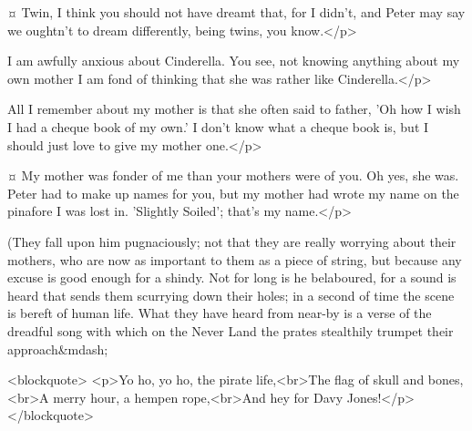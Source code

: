 \firsttwinspeaks {}¤
Twin, I think you should not have dreamt that, for I didn't, and Peter may say we oughtn't to dream differently, being twins, you know.</p>

\tootlesspeaks
I am awfully anxious about Cinderella.
You see, not knowing anything about my own mother I am fond of thinking that she was rather like Cinderella.</p>


\nibsspeaks
All I remember about my mother is that she often said to father, 'Oh how I wish I had a cheque book of my own.'
I don't know what a cheque book is, but I should just love to give my mother one.</p>

\slightlyspeaks {}¤
My mother was fonder of me than your mothers were of you.
Oh yes, she was.
Peter had to make up names for you, but my mother had wrote my name on the pinafore I was lost in.
'Slightly Soiled'; that's my name.</p>

\begin{stagedir}
(They fall upon him pugnaciously;
not that they are really worrying about their mothers, who are now as important to them as a piece of string,
but because any excuse is good enough for a shindy.
Not for long is he belaboured, for a sound is heard that sends them scurrying down their holes; in a second of time the scene is bereft of human life.
What they have heard from near-by is a verse of the dreadful song with which on the Never Land the prates stealthily trumpet their approach&mdash;
\end{stagedir}

<blockquote> <p>Yo ho, yo ho, the pirate life,<br>The flag of skull and bones,<br>A merry hour, a hempen rope,<br>And hey for Davy Jones!</p> </blockquote>

